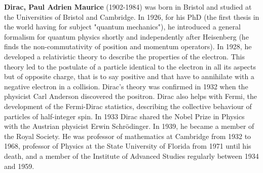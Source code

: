 \textbf{Dirac, Paul Adrien Maurice} (1902-1984) was born in Bristol and studied at the Universities of Bristol and Cambridge. In 1926, for his PhD (the first thesis in the world having for subject "quantum mechanics"), he introduced a general formalism for quantum physics shortly and independently after Heisenberg (he finds the non-commutativity of position and momentum operators). In 1928, he developed a relativistic theory to describe the properties of the electron. This theory led to the postulate of a particle identical to the electron in all its aspects but of opposite charge, that is to say positive and that have to annihilate with a negative electron in a collision. Dirac's theory was confirmed in 1932 when the physicist Carl Anderson discovered the positron. Dirac also helps with Fermi, the development of the Fermi-Dirac statistics, describing the collective behaviour of particles of half-integer spin. In 1933 Dirac shared the Nobel Prize in Physics with the Austrian physicist Erwin Schrödinger. In 1939, he became a member of the Royal Society. He was professor of mathematics at Cambridge from 1932 to 1968, professor of Physics at the State University of Florida from 1971 until his death, and a member of the Institute of Advanced Studies regularly between 1934 and 1959.

